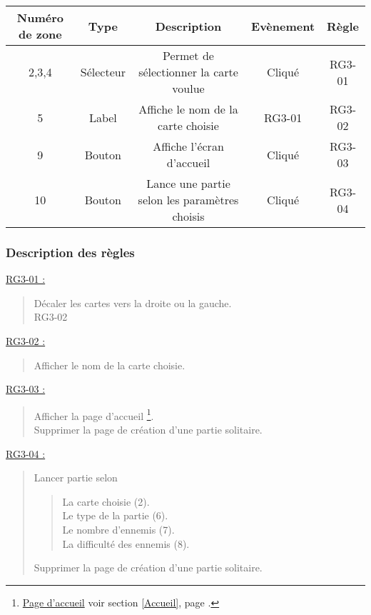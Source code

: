 \documentclass{report}
\begin{document}
			\begin{tabular}{|c|c|c|c|c|} \hline
				Numéro de zone & Type  & Description & Evènement &	Règle \\\hline
				2,3,4 & Sélecteur & Permet de sélectionner la carte voulue & Cliqué & RG3-01 \\\hline
				5 & Label & Affiche le nom de la carte choisie & RG3-01 & RG3-02 \\\hline
				9 & Bouton & Affiche l'écran d'accueil & Cliqué & RG3-03 \\\hline
				10& Bouton & Lance une partie selon les paramètres choisis & Cliqué & RG3-04 \\\hline
			\end{tabular}

\newpage
			
		\subsubsection{Description des règles}

			\underline{RG3-01 :}
				\begin{quote}
					Décaler les cartes vers la droite ou la gauche.\\
					RG3-02\\
				\end{quote}
				
				
			\underline{RG3-02 :}
				\begin{quote}
					Afficher le nom de la carte choisie.\\
				\end{quote}


			\underline{RG3-03 :}
				\begin{quote}
					Afficher la page d'accueil%
						\footnote[1]{
							\hyperlink{Page d'accueil}{Page d'accueil}
							\og voir section \ref{Accueil}, page \pageref{Accueil}.\fg
						}.\\
					Supprimer la page de création d'une partie solitaire.\\
				\end{quote}


			\underline{RG3-04 :}
				\begin{quote}
					 Lancer partie selon
					 \begin{quote}
					 	La carte choisie (2).\\
					 	Le type de la partie (6).\\
					 	Le nombre d'ennemis (7).\\
					 	La difficulté des ennemis (8).
					 \end{quote}
					 Supprimer la page de création d'une partie solitaire.\\
				\end{quote}	
\end{document}
